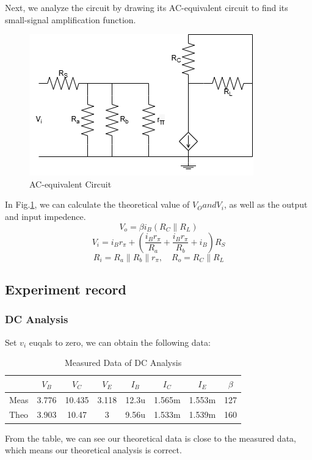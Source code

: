 \begin{enumerate}[I]
                Next, we analyze the circuit by drawing its AC-equivalent circuit to find its small-signal amplification function.\par
                \begin{figure}[H]
                    \centering
                    \includegraphics[width=0.5\linewidth]{Experiment_06/Circuit/Lab6ac.drawio.png}
                    \caption{AC-equivalent Circuit}
                    \label{cir:6ac}
                \end{figure}
                In Fig.\ref{cir:6ac}, we can calculate the theoretical value of $V_O and V_i$, as well as the output and input impedence.
                \begin{equation*}
                    V_o = \beta i_B (R_C \parallel R_L)
                \end{equation*}
                \begin{equation*}
                    V_i = i_B r_\pi + \left(\frac{i_B r_\pi}{R_a} + \frac{i_B r_\pi}{R_b} + i_B \right) R_S
                \end{equation*}
                \begin{equation*}
                    R_i = R_a \parallel R_b \parallel r_\pi, 
                    \quad 
                    R_o = R_C \parallel R_L
                \end{equation*}
        \end{enumerate}

\subsection{Experiment record}
    \subsubsection{DC Analysis}
    Set $v_i$ euqals to zero, we can obtain the following data:
    \begin{table}[H]
        \centering
            \begin{tabular}{|l|ccccccc|}
            \hline
            & $V_B$ & $V_C$  & $V_E$ & $I_B$ & $I_C$  & $I_E$  & $\beta$ \\ \hline
            Meas & 3.776 & 10.435 & 3.118 & 12.3u & 1.565m & 1.553m & 127     \\ \hline
            Theo & 3.903 & 10.47  & 3     & 9.56u & 1.533m & 1.539m & 160     \\ \hline
        \end{tabular}
        \caption{Measured Data of DC Analysis}
        \end{table}
    From the table, we can see our theoretical data is close to the measured data, which means our theoretical analysis is correct.

